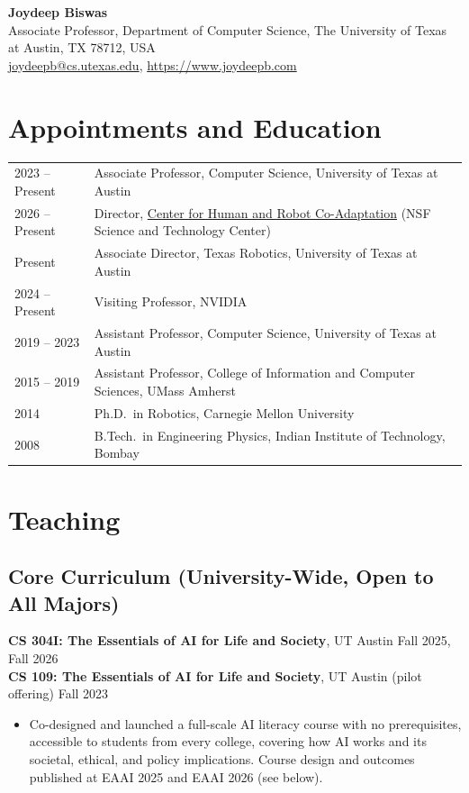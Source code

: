 \documentclass[Times]{article}
\newcommand{\course}[3]{\textbf{#1}, #2 \hfill {\small #3}\\}
\begin{document}
\pagestyle{empty}

\begin{center}
{\Large\textbf{Joydeep Biswas}}\\[0.3em]
Associate Professor, Department of Computer Science, The University of Texas at Austin, TX 78712, USA\\
\href{mailto:joydeepb@cs.utexas.edu}{joydeepb@cs.utexas.edu}, \href{https://www.joydeepb.com}{https://www.joydeepb.com}
\end{center}
\vspace{-1.5em}

\section*{Appointments and Education}
\begin{tabular}{@{}p{2.3cm} >{\raggedright\arraybackslash}p{\dimexpr\textwidth-2.3cm-2\tabcolsep\relax}@{}}
  2023 -- Present & Associate Professor, Computer Science, University of Texas at Austin \\
  2026 -- Present & Director, \href{http://hrc-stc.org/}{Center for Human and Robot Co-Adaptation} (NSF Science and Technology Center) \\
  Present & Associate Director, Texas Robotics, University of Texas at Austin \\
  2024 -- Present & Visiting Professor, NVIDIA \\
  2019 -- 2023 & Assistant Professor, Computer Science, University of Texas at Austin \\
  2015 -- 2019 & Assistant Professor, College of Information and Computer Sciences, UMass Amherst \\
  2014 & Ph.D.\ in Robotics, Carnegie Mellon University \\
  2008 & B.Tech.\ in Engineering Physics, Indian Institute of Technology, Bombay \\
\end{tabular}

\section*{Teaching}
\subsection*{Core Curriculum (University-Wide, Open to All Majors)}
\course{CS 304I: The Essentials of AI for Life and Society}{UT Austin}{Fall 2025, Fall 2026}
\course{CS 109: The Essentials of AI for Life and Society}{UT Austin (pilot offering)}{Fall 2023}
\vspace{-0.6em}
\begin{itemize}
  \item Co-designed and launched a full-scale AI literacy course with no prerequisites, accessible to students
  from every college, covering how AI works and its societal, ethical, and policy implications.
  Course design and outcomes published at EAAI 2025 and EAAI 2026 (see below).
\end{itemize}
\end{document}
